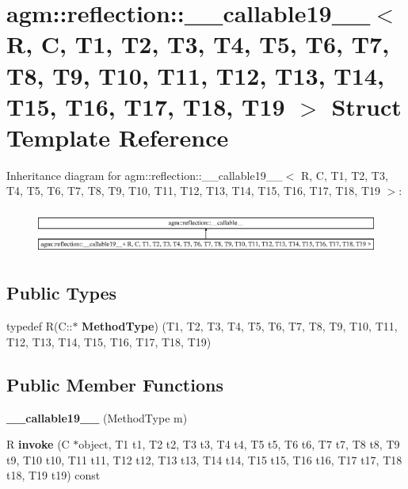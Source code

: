 \hypertarget{structagm_1_1reflection_1_1____callable19____}{}\section{agm\+:\+:reflection\+:\+:\+\_\+\+\_\+callable19\+\_\+\+\_\+$<$ R, C, T1, T2, T3, T4, T5, T6, T7, T8, T9, T10, T11, T12, T13, T14, T15, T16, T17, T18, T19 $>$ Struct Template Reference}
\label{structagm_1_1reflection_1_1____callable19____}
Inheritance diagram for agm\+:\+:reflection\+:\+:\+\_\+\+\_\+callable19\+\_\+\+\_\+$<$ R, C, T1, T2, T3, T4, T5, T6, T7, T8, T9, T10, T11, T12, T13, T14, T15, T16, T17, T18, T19 $>$\+:\begin{figure}[H]
\begin{center}
\leavevmode
\includegraphics[height=1.491345cm]{structagm_1_1reflection_1_1____callable19____}
\end{center}
\end{figure}
\subsection*{Public Types}
\begin{DoxyCompactItemize}
\item 
typedef R(C\+::$\ast$ {\bfseries Method\+Type}) (T1, T2, T3, T4, T5, T6, T7, T8, T9, T10, T11, T12, T13, T14, T15, T16, T17, T18, T19)\hypertarget{structagm_1_1reflection_1_1____callable19_____a86106b14b8dfa6a2ab1fcb2ef44eb35f}{}\label{structagm_1_1reflection_1_1____callable19_____a86106b14b8dfa6a2ab1fcb2ef44eb35f}

\end{DoxyCompactItemize}
\subsection*{Public Member Functions}
\begin{DoxyCompactItemize}
\item 
{\bfseries \+\_\+\+\_\+callable19\+\_\+\+\_\+} (Method\+Type m)\hypertarget{structagm_1_1reflection_1_1____callable19_____ad4d3083772142b44b8a810ce968f7b7c}{}\label{structagm_1_1reflection_1_1____callable19_____ad4d3083772142b44b8a810ce968f7b7c}

\item 
R {\bfseries invoke} (C $\ast$object, T1 t1, T2 t2, T3 t3, T4 t4, T5 t5, T6 t6, T7 t7, T8 t8, T9 t9, T10 t10, T11 t11, T12 t12, T13 t13, T14 t14, T15 t15, T16 t16, T17 t17, T18 t18, T19 t19) const \hypertarget{structagm_1_1reflection_1_1____callable19_____a43dfd570248d8098dc24e0b0e2aedd44}{}\label{structagm_1_1reflection_1_1____callable19_____a43dfd570248d8098dc24e0b0e2aedd44}

\end{DoxyCompactItemize}
